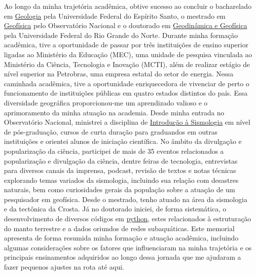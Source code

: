 \documentclass[10pt,a4paper,oneside]{book}
\begin{document}
Ao longo da minha trajetória acadêmica, obtive sucesso ao concluir o bacharelado em \href{https://geologia.ufes.br/}{Geologia} pela Universidade Federal do Espírito Santo, o mestrado em \href{https://www.gov.br/observatorio/pt-br/assuntos/programas-academicos/pos-graduacao-em-geofisica/pos-graduacao-em-geofisica}{Geofísica} pelo Observatório Nacional e o doutorado em \href{https://posgraduacao.ufrn.br/325}{Geodinâmica e Geofísica} pela Universidade Federal do Rio Grande do Norte. Durante minha formação acadêmica, tive a oportunidade de passar por três instituições de ensino superior ligadas ao Ministério da Educação (MEC), uma unidade de pesquisa vinculada ao Ministério da Ciência, Tecnologia e Inovação (MCTI), além de realizar estágio de nível superior na Petrobras, uma empresa estatal do setor de energia. Nessa caminhada acadêmica, tive a oportunidade enriquecedora de vivenciar de perto o funcionamento de instituições públicas em quatro estados distintos do país. Essa diversidade geográfica proporcionou-me um aprendizado valioso e o aprimoramento da minha atuação na academia. Desde minha entrada no Observatório Nacional, ministrei a disciplina de \href{https://www.gov.br/observatorio/pt-br/assuntos/programas-academicos/pos-graduacao-em-geofisica/grade-curricular}{Introdução à Sismologia} em nível de pós-graduação, cursos de curta duração para graduandos em outras instituições e orientei alunos de iniciação científica. No âmbito da divulgação e popularização da ciência, participei de mais de 35 eventos relacionados a popularização e divulgação da ciência, dentre feiras de tecnologia, entrevistas para diversos canais da imprensa, podcast, revisão de textos e notas técnicas explorando temas variados da sismologia, incluindo sua relação com desastres naturais, bem como curiosidades gerais da população sobre a atuação de um pesquisador em geofísica. Desde o mestrado, tenho atuado na área da sismologia e da tectônica da Crosta. Já no doutorado iniciei, de forma sistemática, o desenvolvimento de diversos códigos em \href{https://www.python.org/}{python}, estes relacionados à estruturação do manto terrestre e a dados oriundos de redes subaquáticas. Este memorial apresenta de forma resumida minha formação e atuação acadêmica, incluindo algumas considerações sobre os fatores que influenciaram na minha trajetória e os principais ensinamentos adquiridos ao longo dessa jornada que me ajudaram a fazer pequenos ajustes na rota até aqui.
\end{document}
